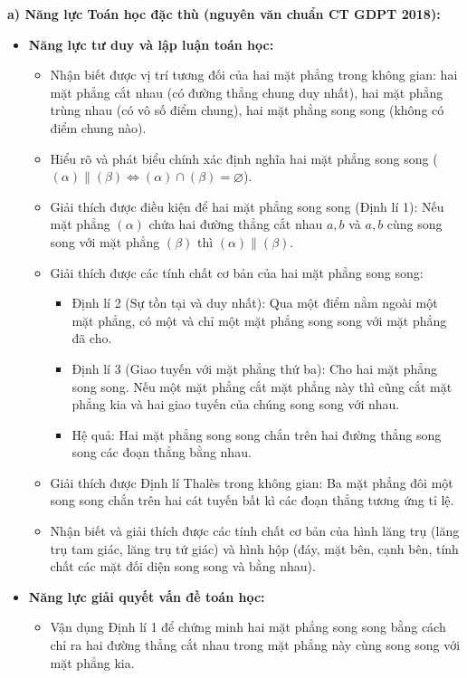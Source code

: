 \documentclass[12pt, a4paper]{article}
\begin{document}
\textbf{a) Năng lực Toán học đặc thù (nguyên văn chuẩn CT GDPT 2018):}
\begin{itemize}[leftmargin=1.5em]
    \item \textbf{Năng lực tư duy và lập luận toán học:}
    \begin{itemize}
        \item Nhận biết được vị trí tương đối của hai mặt phẳng trong không gian: hai mặt phẳng cắt nhau (có đường thẳng chung duy nhất), hai mặt phẳng trùng nhau (có vô số điểm chung), hai mặt phẳng song song (không có điểm chung nào).
        \item Hiểu rõ và phát biểu chính xác định nghĩa hai mặt phẳng song song ($(\alpha) \parallel (\beta) \iff (\alpha) \cap (\beta) = \varnothing$).
        \item Giải thích được điều kiện để hai mặt phẳng song song (Định lí 1): Nếu mặt phẳng $(\alpha)$ chứa hai đường thẳng cắt nhau $a, b$ và $a, b$ cùng song song với mặt phẳng $(\beta)$ thì $(\alpha) \parallel (\beta)$.
        \item Giải thích được các tính chất cơ bản của hai mặt phẳng song song:
        \begin{itemize}
            \item Định lí 2 (Sự tồn tại và duy nhất): Qua một điểm nằm ngoài một mặt phẳng, có một và chỉ một mặt phẳng song song với mặt phẳng đã cho.
            \item Định lí 3 (Giao tuyến với mặt phẳng thứ ba): Cho hai mặt phẳng song song. Nếu một mặt phẳng cắt mặt phẳng này thì cũng cắt mặt phẳng kia và hai giao tuyến của chúng song song với nhau.
            \item Hệ quả: Hai mặt phẳng song song chắn trên hai đường thẳng song song các đoạn thẳng bằng nhau.
        \end{itemize}
        \item Giải thích được Định lí Thalès trong không gian: Ba mặt phẳng đôi một song song chắn trên hai cát tuyến bất kì các đoạn thẳng tương ứng tỉ lệ.
        \item Nhận biết và giải thích được các tính chất cơ bản của hình lăng trụ (lăng trụ tam giác, lăng trụ tứ giác) và hình hộp (đáy, mặt bên, cạnh bên, tính chất các mặt đối diện song song và bằng nhau).
    \end{itemize}
    \item \textbf{Năng lực giải quyết vấn đề toán học:}
    \begin{itemize}
        \item Vận dụng Định lí 1 để chứng minh hai mặt phẳng song song bằng cách chỉ ra hai đường thẳng cắt nhau trong mặt phẳng này cùng song song với mặt phẳng kia.

\end{itemize}
\end{itemize}
\end{document}
